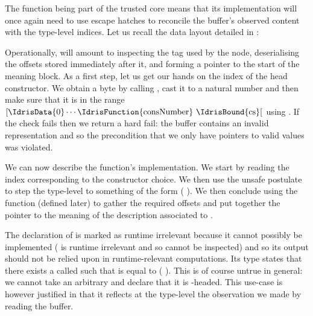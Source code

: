 The function  being part of the trusted
core means that its implementation will once again need to
use escape hatches to reconcile the buffer's observed content
with the type-level indices.
%
Let us recall the data layout detailed in :
\begin{center}

\end{center}
Operationally, 
will amount to inspecting the tag used by the node,
deserialising the offsets stored immediately after it,
and forming a pointer to the start of the meaning block.
%
As a first step, let us get our hands on the index of the head constructor.
We obtain a byte by calling , cast it to a
natural number and then make sure that it is in the range
$[\text{\IdrisData{0}} \cdots \text{\IdrisFunction{consNumber} \IdrisBound{cs}}[$ using
. If the check fails then we return
a hard fail: the buffer contains an invalid representation
and so the precondition that we only have pointers to valid
values was violated.

We can now describe the  function's implementation.
We start by reading the index 
corresponding to the constructor choice.
%
We then use the unsafe  postulate to step the
type-level  to something of the form
( \IdrisData{\#} ).
%
We then conclude using the  function
(defined later) to gather the required offsets and put together
the pointer to the meaning of the description associated to .


The declaration of  is marked as runtime
irrelevant because it cannot possibly be implemented
( is runtime irrelevant and so cannot be inspected)
and so its output should not be relied upon in runtime-relevant
computations.
%
Its type states that there exists a  called
 such that  is equal to
( \IdrisData{\#} ).
%
This is of course untrue in general: we cannot take an arbitrary
 and declare that it is -headed.
This use-case is however justified in that it reflects at the
type-level the observation we made by reading the buffer.

